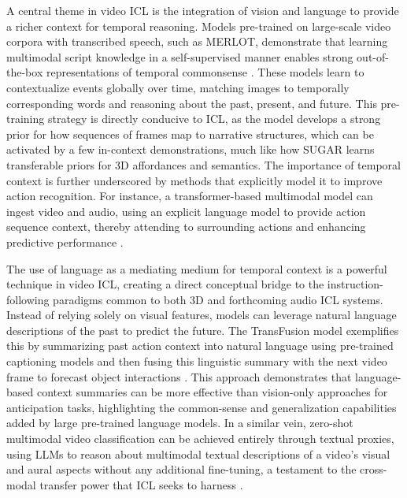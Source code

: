 \documentclass[11pt]{article}
\begin{document}
A central theme in video ICL is the integration of vision and language to provide a richer context for temporal reasoning. Models pre-trained on large-scale video corpora with transcribed speech, such as MERLOT, demonstrate that learning multimodal script knowledge in a self-supervised manner enables strong out-of-the-box representations of temporal commonsense \cite{ref265}. These models learn to contextualize events globally over time, matching images to temporally corresponding words and reasoning about the past, present, and future. This pre-training strategy is directly conducive to ICL, as the model develops a strong prior for how sequences of frames map to narrative structures, which can be activated by a few in-context demonstrations, much like how SUGAR learns transferable priors for 3D affordances and semantics. The importance of temporal context is further underscored by methods that explicitly model it to improve action recognition. For instance, a transformer-based multimodal model can ingest video and audio, using an explicit language model to provide action sequence context, thereby attending to surrounding actions and enhancing predictive performance \cite{ref266}.

The use of language as a mediating medium for temporal context is a powerful technique in video ICL, creating a direct conceptual bridge to the instruction-following paradigms common to both 3D and forthcoming audio ICL systems. Instead of relying solely on visual features, models can leverage natural language descriptions of the past to predict the future. The TransFusion model exemplifies this by summarizing past action context into natural language using pre-trained captioning models and then fusing this linguistic summary with the next video frame to forecast object interactions \cite{ref267}. This approach demonstrates that language-based context summaries can be more effective than vision-only approaches for anticipation tasks, highlighting the common-sense and generalization capabilities added by large pre-trained language models. In a similar vein, zero-shot multimodal video classification can be achieved entirely through textual proxies, using LLMs to reason about multimodal textual descriptions of a video's visual and aural aspects without any additional fine-tuning, a testament to the cross-modal transfer power that ICL seeks to harness \cite{ref268}.
\end{document}
